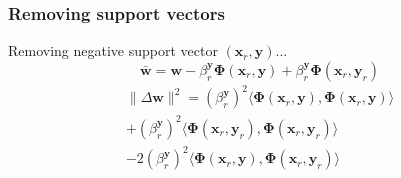 \begin{frame}
    \frametitle{Removing support vectors}
    Removing negative support vector \((\mathbf{x}_r, \mathbf{y})\)...
    \begin{equation}
        \mathbf{\bar{w}} = \mathbf{w} - \beta_r^\mathbf{y} \mathbf{\Phi}\left(\mathbf{x}_r,
        \mathbf{y}\right) + \beta_r^\mathbf{y} \mathbf{\Phi}\left(\mathbf{x}_r, \mathbf{y}_r\right)
    \end{equation}
    \begin{multline}
        \|\Delta \mathbf{w}\|^2 = \left(\beta_r^\mathbf{y}\right)^2
            \langle \mathbf{\Phi}\left(\mathbf{x}_r, \mathbf{y}\right), \mathbf{\Phi}\left(\mathbf{x}_r, \mathbf{y}\right) \rangle \nonumber \\
            + \left(\beta_r^\mathbf{y}\right)^2 \langle \mathbf{\Phi}\left(\mathbf{x}_r, \mathbf{y}_r\right), \mathbf{\Phi}\left(\mathbf{x}_r, \mathbf{y}_r\right) \rangle \\
            - 2 \left(\beta_r^\mathbf{y}\right)^2 \langle \mathbf{\Phi}\left(\mathbf{x}_r, \mathbf{y}\right), \mathbf{\Phi}\left(\mathbf{x}_r, \mathbf{y}_r\right) \rangle
    \end{multline}
\end{frame}


